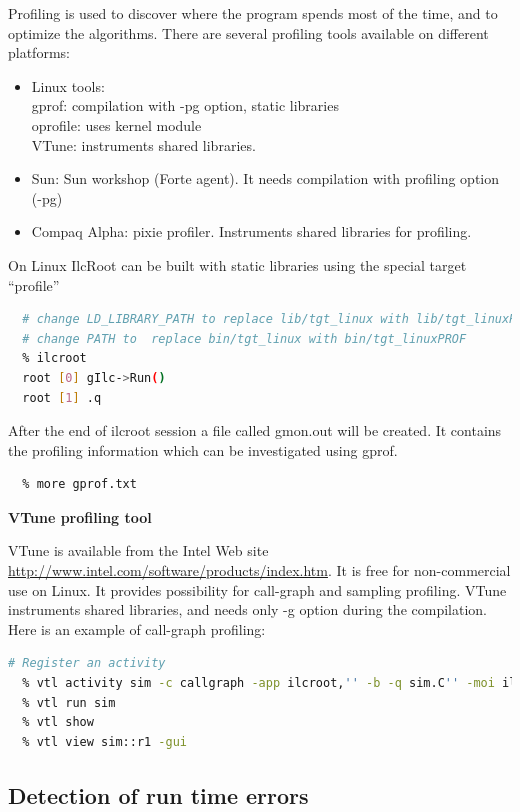 \documentclass[12pt,a4paper,twoside]{article}
\begin{document}
Profiling is used to discover where the program spends most of the
time, and to optimize the algorithms. There are several profiling
tools available on different platforms:
\begin{itemize}
\item Linux tools:\\
  gprof: compilation with -pg option, static libraries\\
  oprofile: uses kernel module\\
  VTune: instruments shared libraries.
\item Sun: Sun workshop (Forte agent). It needs compilation with
  profiling option (-pg) 
\item Compaq Alpha: pixie profiler. Instruments shared libraries for profiling.
\end{itemize}

On Linux IlcRoot can be built with static libraries using the special
target ``profile''

\begin{lstlisting}[language=sh]
  % make profile
  # change LD_LIBRARY_PATH to replace lib/tgt_linux with lib/tgt_linuxPROF
  # change PATH to  replace bin/tgt_linux with bin/tgt_linuxPROF
  % ilcroot
  root [0] gIlc->Run()
  root [1] .q
\end{lstlisting}

After the end of ilcroot session a file called gmon.out will be created. It
contains the profiling information which can be investigated using
gprof.

\begin{lstlisting}[language=sh]
  % gprof `which ilcroot` | tee gprof.txt
  % more gprof.txt
\end{lstlisting}


\noindent
\textbf{VTune profiling tool}

VTune is available from the Intel Web site
\url{http://www.intel.com/software/products/index.htm}. It is free for
non-commercial use on Linux. It provides possibility for call-graph
and sampling profiling. VTune instruments shared libraries, and needs
only -g option during the compilation. Here is an example of
call-graph profiling:

\begin{lstlisting}[language=sh]
  # Register an activity
  % vtl activity sim -c callgraph -app ilcroot,'' -b -q sim.C'' -moi ilcroot
  % vtl run sim
  % vtl show
  % vtl view sim::r1 -gui
\end{lstlisting}

\subsection{Detection of run time errors}
\end{document}
